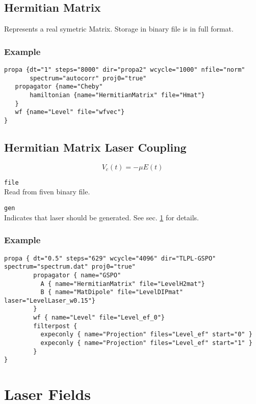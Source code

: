 \documentclass[a4paper,12pt]{scrbook}
\newcommand{\option}[2]{\item \texttt{#1}\\ #2}
\begin{document}
\subsection{Hermitian Matrix}
Represents a real symetric Matrix.
Storage in binary file is in full format.

\subsubsection*{Example}
\begin{verbatim}
propa {dt="1" steps="8000" dir="propa2" wcycle="1000" nfile="norm"
       spectrum="autocorr" proj0="true"
   propagator {name="Cheby"
       hamiltonian {name="HermitianMatrix" file="Hmat"}
   }
   wf {name="Level" file="wfvec"}
} 
\end{verbatim}


\subsection{Hermitian Matrix Laser Coupling}
\begin{equation}
 V_c(t) = -\mu E(t)
\end{equation}

\begin{options}
 \option{file}{Read from fiven binary file.}
 \option{gen}{Indicates that laser should be generated. See sec. \ref{sec:LaserFields} for details.}
\end{options}

\subsubsection*{Example}
\begin{verbatim}
propa { dt="0.5" steps="629" wcycle="4096" dir="TLPL-GSPO" spectrum="spectrum.dat" proj0="true"
        propagator { name="GSPO"
          A { name="HermitianMatrix" file="LevelH2mat"}
          B { name="MatDipole" file="LevelDIPmat" laser="LevelLaser_w0.15"}
        }
        wf { name="Level" file="Level_ef_0"}
        filterpost {
          expeconly { name="Projection" files="Level_ef" start="0" }
          expeconly { name="Projection" files="Level_ef" start="1" }
        }
} 
\end{verbatim}

\section{Laser Fields}
\label{sec:LaserFields}
\end{document}
